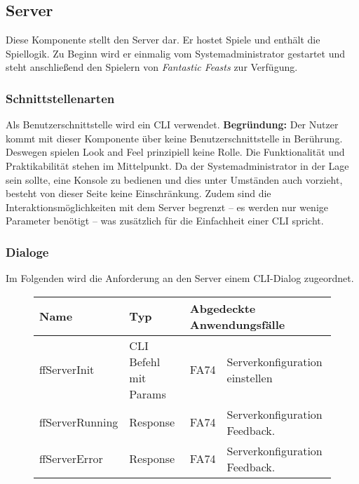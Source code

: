 \subsection{Server}
Diese Komponente stellt den Server dar. Er hostet Spiele und enthält die Spiellogik. Zu Beginn wird er einmalig vom Systemadministrator gestartet und steht anschließend den Spielern von \textit{Fantastic Feasts} zur Verfügung.

\subsubsection{Schnittstellenarten}
Als Benutzerschnittstelle wird ein CLI verwendet. \textbf{Begründung:} Der Nutzer kommt mit dieser Komponente über keine Benutzerschnittstelle in Berührung. Deswegen spielen Look and Feel prinzipiell keine Rolle. Die Funktionalität und Praktikabilität stehen im Mittelpunkt. Da der Systemadministrator in der Lage sein sollte, eine Konsole zu bedienen und dies unter Umständen auch vorzieht, besteht von dieser Seite keine Einschränkung. Zudem sind die Interaktionsmöglichkeiten mit dem Server begrenzt – es werden nur wenige Parameter benötigt – was zusätzlich für die Einfachheit einer CLI spricht.

\subsubsection{Dialoge}
Im Folgenden wird die Anforderung an den Server einem CLI-Dialog zugeordnet.

\begin{figure}[H]
    \centering
    \begin{tabular}{| l l l l |}
    \hline
    \textbf{Name} & \textbf{Typ} & \multicolumn{2}{l|}{\textbf{Abgedeckte Anwendungsfälle}} \\\hline
    ffServerInit & CLI Befehl mit Params & FA74 & Serverkonfiguration einstellen \\\hline
    ffServerRunning & Response & FA74 & Serverkonfiguration Feedback.\\\hline
    ffServerError & Response & FA74 & Serverkonfiguration Feedback.\\\hline
    
    \end{tabular}
\end{figure}


